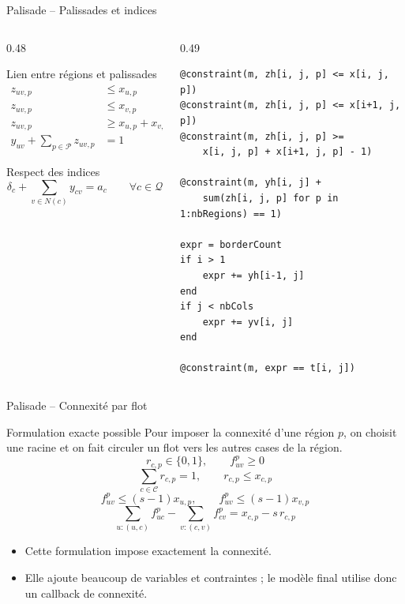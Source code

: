 \documentclass[11pt,aspectratio=169]{beamer}
\newcommand{\CellSet}{\mathcal{C}}
\newcommand{\RegSet}{\mathcal{P}}
\newcommand{\ClueSet}{\mathcal{Q}}
\newcommand{\binary}{\{0,1\}}
\begin{document}
\begin{frame}[fragile]{Palisade -- Palissades et indices}
\small
\begin{columns}[T,onlytextwidth]
\begin{column}{0.48\textwidth}
\begin{block}{Lien entre régions et palissades}
\[
\begin{aligned}
z_{uv,p} &\le x_{u,p}\\
z_{uv,p} &\le x_{v,p}\\
z_{uv,p} &\ge x_{u,p}+x_{v,p}-1\\
y_{uv}+\sum_{p\in\RegSet}z_{uv,p} &= 1
\end{aligned}
\]
\end{block}
\begin{block}{Respect des indices}
\[
\delta_c+\sum_{v\in N(c)}y_{cv}=a_c
\qquad \forall c\in\ClueSet
\]
\end{block}
\end{column}
\begin{column}{0.49\textwidth}
\begin{lstlisting}[basicstyle=\ttfamily\tiny]
@constraint(m, zh[i, j, p] <= x[i, j, p])
@constraint(m, zh[i, j, p] <= x[i+1, j, p])
@constraint(m, zh[i, j, p] >=
    x[i, j, p] + x[i+1, j, p] - 1)

@constraint(m, yh[i, j] +
    sum(zh[i, j, p] for p in 1:nbRegions) == 1)

expr = borderCount
if i > 1
    expr += yh[i-1, j]
end
if j < nbCols
    expr += yv[i, j]
end

@constraint(m, expr == t[i, j])
\end{lstlisting}
\end{column}
\end{columns}
\end{frame}

\begin{frame}{Palisade -- Connexité par flot}
\small
\begin{block}{Formulation exacte possible}
Pour imposer la connexité d'une région \(p\), on choisit une racine et on fait circuler un flot vers les autres cases de la région.
\[
r_{c,p}\in\binary,\qquad f^p_{uv}\ge 0
\]
\[
\sum_{c\in\CellSet}r_{c,p}=1,\qquad
r_{c,p}\le x_{c,p}
\]
\[
f^p_{uv}\le (s-1)x_{u,p},\qquad
f^p_{uv}\le (s-1)x_{v,p}
\]
\[
\sum_{u:(u,c)} f^p_{uc}-\sum_{v:(c,v)} f^p_{cv}
=x_{c,p}-s\,r_{c,p}
\]
\end{block}
\vspace{-0.1cm}
\begin{itemize}
  \item Cette formulation impose exactement la connexité.
  \item Elle ajoute beaucoup de variables et contraintes ; le modèle final utilise donc un callback de connexité.
\end{itemize}
\end{frame}
\end{document}
